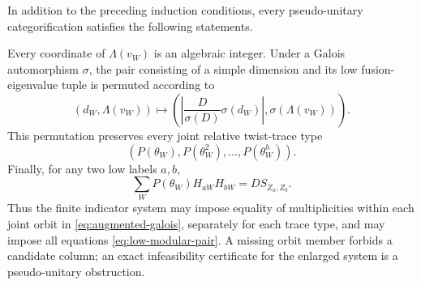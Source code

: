\begin{proposition}
\label{prop:modular-frontier}
In addition to the preceding induction conditions, every pseudo-unitary
categorification satisfies the following statements.

Every coordinate of $\Lambda(v_W)$ is an algebraic integer. Under a
Galois automorphism $\sigma$, the pair consisting of a simple dimension
and its low fusion-eigenvalue tuple is permuted according to
\begin{equation}\label{eq:augmented-galois}
 (d_W,\Lambda(v_W))\longmapsto
 \left(\left|\frac{D}{\sigma(D)}\sigma(d_W)\right|,
                         \sigma(\Lambda(v_W))\right).
\end{equation}
This permutation preserves every joint relative twist-trace type
\[
 (P(\theta_W),P(\theta_W^2),\ldots,P(\theta_W^h)).
\]
Finally, for any two low labels $a,b$,
\begin{equation}\label{eq:low-modular-pair}
 \sum_W P(\theta_W)H_{aW}H_{bW}=D S_{Z_a,Z_b}.
\end{equation}
Thus the finite indicator system may impose equality of multiplicities
within each joint orbit in \eqref{eq:augmented-galois}, separately for
each trace type, and may impose all equations
\eqref{eq:low-modular-pair}. A missing orbit member forbids a candidate
column; an exact infeasibility certificate for the enlarged system is a
pseudo-unitary obstruction.
\end{proposition}
